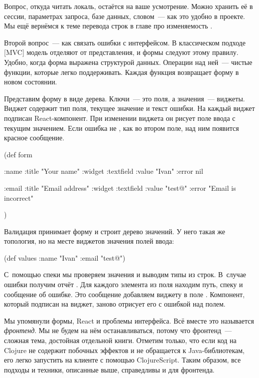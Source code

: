 Вопрос, откуда читать локаль, остаётся на ваше усмотрение. Можно хранить её в
сессии, параметрах запроса, базе данных, словом~--- как это удобно в проекте. Мы
ещё вернёмся к теме перевода строк в главе про изменяемость .

Второй вопрос~--- как связать ошибки с интерфейсом. В классическом подходе
[MVC]
модель отделяют от представления, и формы следуют этому правилу. Удобно, когда
форма выражена структурой данных. Операции над ней~--- чистые функции,
которые легко поддерживать. Каждая функция возвращает форму в новом состоянии.

Представим форму в виде дерева. Ключи~--- это поля, а значения~---
виджеты. Виджет содержит тип поля, текущее значение и текст ошибки. На каждый
виджет подписан React-компонент. При изменении виджета он рисует поле ввода с
текущим значением. Если ошибка не , как во втором поле, над ним
появится красное сообщение.

\begin{clojure}
(def form
  {:name {:title "Your name"
          :widget :textfield
          :value "Ivan"
          :error nil}

   :email {:title "Email address"
           :widget :textfield
           :value "test@"
           :error "Email is incorrect"}})
\end{clojure}

Валидация принимает форму и строит дерево значений. У него такая же топология, но
на месте виджетов значения полей ввода:

\begin{clojure}
(def values
  {:name "Ivan"
   :email "test@"})
\end{clojure}

С~помощью спеки мы проверяем значения и выводим типы из строк. В~случае ошибки
получим отчёт . Для каждого элемента из поля 
находим путь, спеку и сообщение об ошибке. Это сообщение добавляем виджету в
поле . Компонент, который подписан на виджет, заново отрисует его с
ошибкой над полем.


Мы упомянули формы, React и проблемы интерфейса. Всё вместе это называется
\emph{фронтенд}. Мы не будем на нём останавливаться, потому что фронтенд~---
сложная тема, достойная отдельной книги. Отметим только, что если код на Clojure
не содержит побочных эффектов и не обращается к Java-библиотекам, его легко
запустить на клиенте с помощью ClojureScript. Таким образом, все подходы и
техники, описанные выше, справедливы и для фронтенда.

